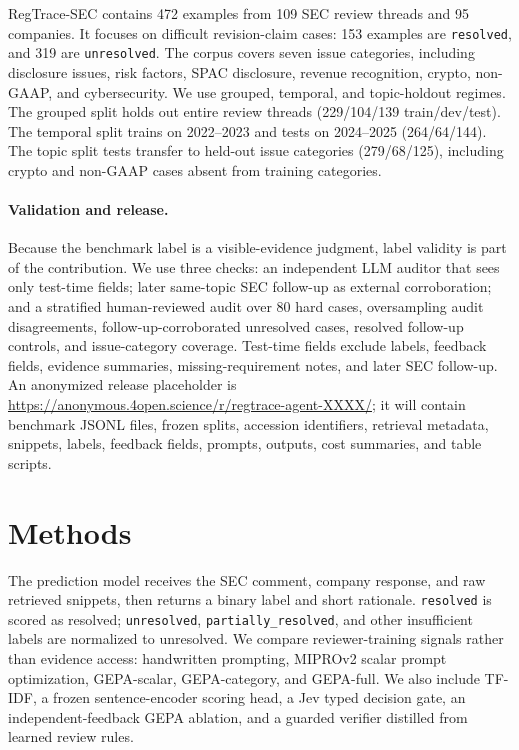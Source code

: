 \documentclass[11pt]{article}
\newcommand{\dataset}{RegTrace-SEC}
\begin{document}
\dataset{} contains 472 examples from 109 SEC review threads and 95 companies. It focuses on difficult revision-claim cases: 153 examples are \texttt{resolved}, and 319 are \texttt{unresolved}. The corpus covers seven issue categories, including disclosure issues, risk factors, SPAC disclosure, revenue recognition, crypto, non-GAAP, and cybersecurity. We use grouped, temporal, and topic-holdout regimes. The grouped split holds out entire review threads (229/104/139 train/dev/test). The temporal split trains on 2022--2023 and tests on 2024--2025 (264/64/144). The topic split tests transfer to held-out issue categories (279/68/125), including crypto and non-GAAP cases absent from training categories.

\paragraph{Validation and release.}
Because the benchmark label is a visible-evidence judgment, label validity is part of the contribution. We use three checks: an independent LLM auditor that sees only test-time fields; later same-topic SEC follow-up as external corroboration; and a stratified human-reviewed audit over 80 hard cases, oversampling audit disagreements, follow-up-corroborated unresolved cases, resolved follow-up controls, and issue-category coverage. Test-time fields exclude labels, feedback fields, evidence summaries, missing-requirement notes, and later SEC follow-up. An anonymized release placeholder is \url{https://anonymous.4open.science/r/regtrace-agent-XXXX/}; it will contain benchmark JSONL files, frozen splits, accession identifiers, retrieval metadata, snippets, labels, feedback fields, prompts, outputs, cost summaries, and table scripts.

\section{Methods}

The prediction model receives the SEC comment, company response, and raw retrieved snippets, then returns a binary label and short rationale. \texttt{resolved} is scored as resolved; \texttt{unresolved}, \texttt{partially\_resolved}, and other insufficient labels are normalized to unresolved. We compare reviewer-training signals rather than evidence access: handwritten prompting, MIPROv2 scalar prompt optimization, GEPA-scalar, GEPA-category, and GEPA-full. We also include TF-IDF, a frozen sentence-encoder scoring head, a Jev typed decision gate, an independent-feedback GEPA ablation, and a guarded verifier distilled from learned review rules.
\end{document}
